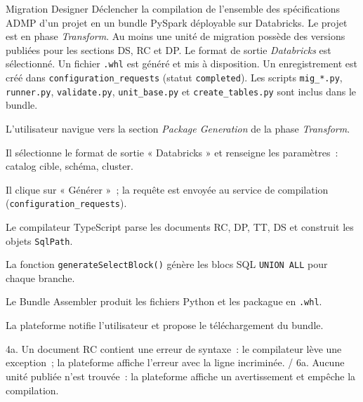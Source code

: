 %
{Migration Designer}%
{Déclencher la compilation de l'ensemble des spécifications ADMP d'un projet en un bundle PySpark déployable sur Databricks.}%
{Le projet est en phase \textit{Transform}. Au moins une unité de migration possède des versions publiées pour les sections DS, RC et DP. Le format de sortie \textit{Databricks} est sélectionné.}%
{Un fichier \texttt{.whl} est généré et mis à disposition. Un enregistrement est créé dans \texttt{configuration\_requests} (statut \texttt{completed}). Les scripts \texttt{mig\_*.py}, \texttt{runner.py}, \texttt{validate.py}, \texttt{unit\_base.py} et \texttt{create\_tables.py} sont inclus dans le bundle.}%
{%
\item L'utilisateur navigue vers la section \textit{Package Generation} de la phase \textit{Transform}.
\item Il sélectionne le format de sortie « Databricks » et renseigne les paramètres~: catalog cible, schéma, cluster.
\item Il clique sur « Générer »~; la requête est envoyée au service de compilation (\texttt{configuration\_requests}).
\item Le compilateur TypeScript parse les documents RC, DP, TT, DS et construit les objets \texttt{SqlPath}.
\item La fonction \texttt{generateSelectBlock()} génère les blocs SQL \texttt{UNION ALL} pour chaque branche.
\item Le Bundle Assembler produit les fichiers Python et les packague en \texttt{.whl}.
\item La plateforme notifie l'utilisateur et propose le téléchargement du bundle.
}%
{4a. Un document RC contient une erreur de syntaxe~: le compilateur lève une exception~; la plateforme affiche l'erreur avec la ligne incriminée. / 6a. Aucune unité publiée n'est trouvée~: la plateforme affiche un avertissement et empêche la compilation.}

